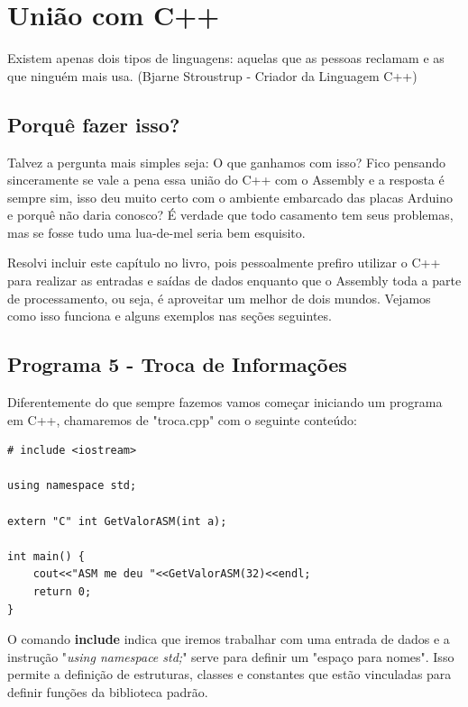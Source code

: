 \chapter{União com C++}

\begin{remark}
	Existem apenas dois tipos de linguagens: aquelas que as pessoas reclamam e as que ninguém mais usa. (Bjarne Stroustrup - Criador da Linguagem C++) 
\end{remark}

\section{Porquê fazer isso?}
Talvez a pergunta mais simples seja: O que ganhamos com isso? Fico pensando sinceramente se vale a pena essa união do C++ com o Assembly e a resposta é sempre sim, isso deu muito certo com o ambiente embarcado das placas Arduino e porquê não daria conosco? É verdade que todo casamento tem seus problemas, mas se fosse tudo uma lua-de-mel seria bem esquisito.

Resolvi incluir este capítulo no livro, pois pessoalmente prefiro utilizar o C++ para realizar as entradas e saídas de dados enquanto que o Assembly toda a parte de processamento, ou seja, é aproveitar um melhor de dois mundos. Vejamos como isso funciona e alguns exemplos nas seções seguintes.

\section{Programa 5 - Troca de Informações}

Diferentemente do que sempre fazemos vamos começar iniciando um programa em C++, chamaremos de "troca.cpp" com o seguinte conteúdo:
\begin{lstlisting}[]
# include <iostream>

using namespace std;

extern "C" int GetValorASM(int a);

int main() {
	cout<<"ASM me deu "<<GetValorASM(32)<<endl;
	return 0;
}
\end{lstlisting}

O comando \textbf{include} indica que iremos trabalhar com uma entrada de dados e a instrução "\textit{using namespace std;}" serve para definir um "espaço para nomes". Isso permite a definição de estruturas, classes e constantes que estão vinculadas para definir funções da biblioteca padrão. 

